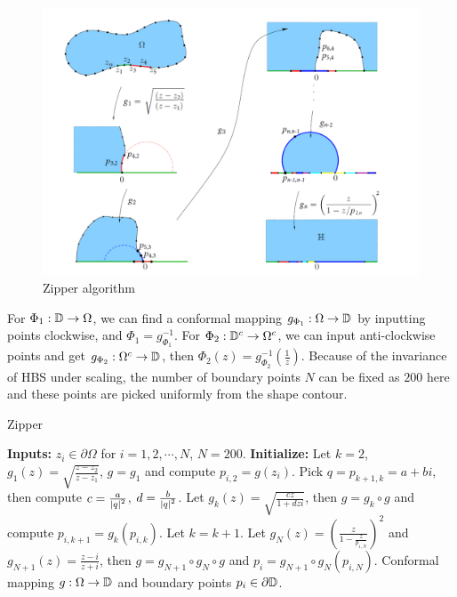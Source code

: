 \documentclass[review,onefignum,onetabnum]{siamonline190516}
\begin{document}
    \begin{figure}
    \begin{center}
        \includegraphics[width=12cm]{zipper_algo.png}
    \end{center}
    \caption{Zipper algorithm}
    \label{zipper algo}
    \end{figure}

    For $\Phi_1 : \mathbb{D} \rightarrow \Omega$, we can find a conformal mapping $g_{\Phi_1}: \Omega \rightarrow \mathbb{D}$ by inputting points clockwise, and $\Phi_1 = g_{\Phi_1}^{-1}$. For $\Phi_2 : \mathbb{D}^c \rightarrow \Omega^c$, we can input anti-clockwise points and get $g_{\Phi_2} : \Omega^c \rightarrow \mathbb{D}$, then $\Phi_2(z) = g_{\Phi_2}^{-1}(\frac{1}{z})$. Because of the invariance of HBS under scaling, the number of boundary points $N$ can be fixed as $200$ here and these points are picked uniformly from the shape contour. 

        \begin{algorithm}[H]                           %
        \caption{Zipper}          %
        \label{zipper}      %
        \begin{algorithmic}  %
            \STATE \textbf{Inputs:} $z_i \in \partial \Omega$ for $i=1, 2, \cdots, N$, $N=200$. %
            \STATE \textbf{Initialize:} Let $k=2$, $g_1(z) = \sqrt{\frac{z-z_2}{z-z_1}}$, $g= g_1$ and compute $p_{i,2}=g(z_i)$.
                \STATE Pick $q = p_{k+1, k} = a + b i$, then compute $c = \frac{a}{\left\vert q \right\vert^2}$, $d = \frac{b}{\left\vert q \right\vert^2}$.
                \STATE Let $g_k(z) = \sqrt{\frac{cz}{1+dzi}}$, then $g = g_k \circ g$ and compute $p_{i, k+1} = g_k(p_{i, k})$.
                \STATE Let $k = k+1$.
            \ENDWHILE
            \STATE Let $g_{N}(z) = \left(\frac{z}{1-\frac{z}{p_{1,N}}}\right)^2$ and $g_{N+1}(z) = \frac{z-i}{z+i}$, then $g = g_{N+1} \circ g_N \circ g$ and $p_i = g_{N+1} \circ g_N(p_{i,N})$.
            \RETURN Conformal mapping $g: \Omega \rightarrow \mathbb{D}$ and boundary points $p_i \in \partial \mathbb{D}$.
        \end{algorithmic}
        \end{algorithm}
\end{document}
